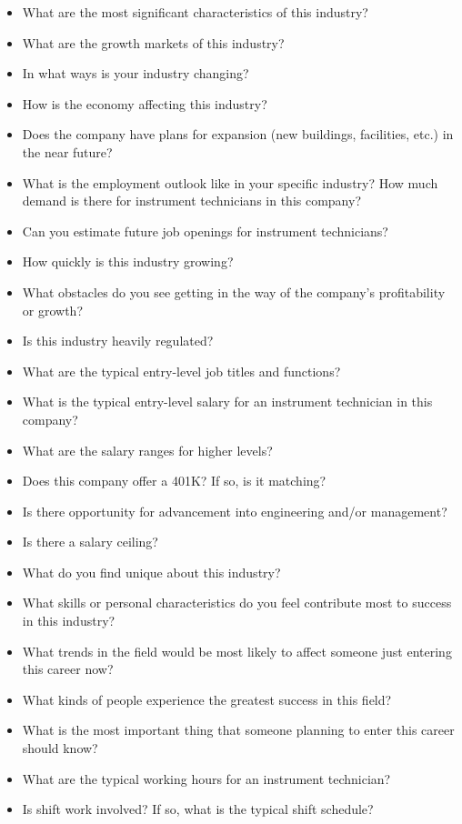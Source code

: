 \begin{itemize}
\item{} What are the most significant characteristics of this industry?
\item{} What are the growth markets of this industry?
\item{} In what ways is your industry changing?
\item{} How is the economy affecting this industry?
\item{} Does the company have plans for expansion (new buildings, facilities, etc.) in the near future?
\item{} What is the employment outlook like in your specific industry?  How much demand is there for instrument technicians in this company?
\item{} Can you estimate future job openings for instrument technicians?
\item{} How quickly is this industry growing?
\item{} What obstacles do you see getting in the way of the company's profitability or growth?
\item{} Is this industry heavily regulated?
\item{} What are the typical entry-level job titles and functions?
\item{} What is the typical entry-level salary for an instrument technician in this company?
\item{} What are the salary ranges for higher levels?
\item{} Does this company offer a 401K?  If so, is it matching?
\item{} Is there opportunity for advancement into engineering and/or management?
\item{} Is there a salary ceiling?
\item{} What do you find unique about this industry?
\item{} What skills or personal characteristics do you feel contribute most to success in this industry?
\item{} What trends in the field would be most likely to affect someone just entering this career now?
\item{} What kinds of people experience the greatest success in this field?
\item{} What is the most important thing that someone planning to enter this career should know?
\item{} What are the typical working hours for an instrument technician?
\item{} Is shift work involved?  If so, what is the typical shift schedule?

\end{itemize}
